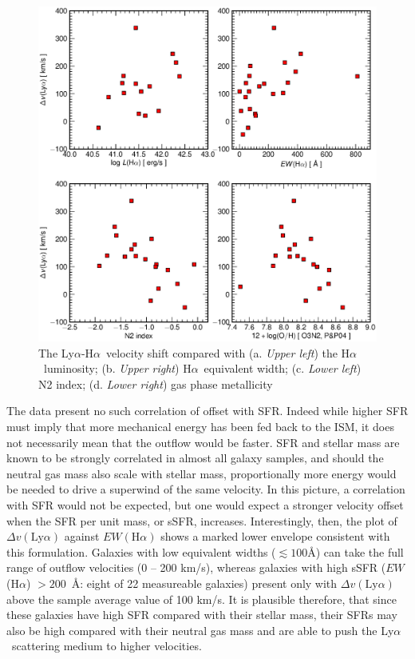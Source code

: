 \documentclass[manuscript]{emulateapj}
\newcommand{\lya}{Ly$\alpha$}
\newcommand{\ha}{H$\alpha$}
\begin{document}
\begin{figure}[t!]
   \centering
   \includegraphics[scale=.4]{dvel_ha.eps}
   \caption{The \lya-\ha\ velocity shift compared with 
			 (a. \emph{Upper left}) the \ha\ luminosity; 
			 (b. \emph{Upper right}) \ha\ equivalent width; 
			 (c. \emph{Lower left}) N2 index; 
			 (d. \emph{Lower right}) gas phase metallicity }
   \label{fig:dvha}
\end{figure}

The data present no such correlation of offset with SFR. Indeed while 
higher SFR must imply that more mechanical energy has been fed back to 
the ISM, it does not necessarily mean that the outflow would be faster. 
SFR and stellar mass are known to be strongly correlated 
in almost all galaxy samples, and should the neutral gas mass also scale
with stellar mass, proportionally more energy would be needed 
to drive a superwind of the same velocity. In this picture, a correlation 
with SFR would not be expected, but one would expect a stronger velocity 
offset when the SFR per unit mass, or sSFR, increases. Interestingly, then, 
the plot of $\Delta v(\mathrm{Ly}\alpha)$ against $EW(\mathrm{H}\alpha)$ shows 
a marked lower envelope consistent with this formulation. Galaxies with low 
equivalent widths ($\lesssim 100$\AA) can 
take the full range of outflow velocities (0 -- 200 km/s), whereas galaxies with
high sSFR ($EW$(\ha) $>200$~\AA: eight of 22 measureable galaxies) present only 
with $\Delta v(\mathrm{Ly}\alpha)$ 
above the sample average value of 100 km/s.  It is plausible
therefore, that since these galaxies have high SFR compared with their stellar mass, 
their SFRs may also be high compared with their neutral gas mass and are able to
push the \lya\ scattering medium to higher velocities. 
\end{document}
